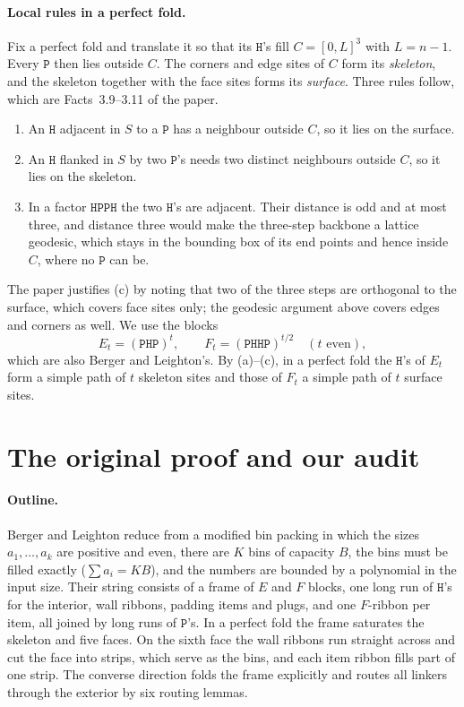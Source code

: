 \documentclass[11pt,letterpaper]{article}
\theoremstyle{definition}
\theoremstyle{remark}
\newcommand{\Hh}{\mathtt{H}}
\newcommand{\Pp}{\mathtt{P}}
\begin{document}
\paragraph{Local rules in a perfect fold.}
Fix a perfect fold and translate it so that its $\Hh$'s fill $C=[0,L]^3$ with $L=n-1$. Every $\Pp$
then lies outside $C$. The corners and edge sites of $C$ form its \emph{skeleton}, and the
skeleton together with the face sites forms its \emph{surface}. Three rules follow, which are
Facts~3.9--3.11 of the paper.
\begin{enumerate}[label=(\alph*)]
  \item An $\Hh$ adjacent in $S$ to a $\Pp$ has a neighbour outside $C$, so it lies on the surface.
  \item An $\Hh$ flanked in $S$ by two $\Pp$'s needs two distinct neighbours outside $C$, so it lies
    on the skeleton.
  \item In a factor $\Hh\Pp\Pp\Hh$ the two $\Hh$'s are adjacent. Their distance is odd and at most
    three, and distance three would make the three-step backbone a lattice geodesic, which stays in
    the bounding box of its end points and hence inside $C$, where no $\Pp$ can be.
\end{enumerate}
The paper justifies (c) by noting that two of the three steps are orthogonal to the surface, which
covers face sites only; the geodesic argument above covers edges and corners as well. We use the
blocks
\[
E_t=(\Pp\Hh\Pp)^t,\qquad F_t=(\Pp\Hh\Hh\Pp)^{t/2}\quad(t\text{ even}),
\]
which are also Berger and Leighton's. By (a)--(c), in a perfect fold the $\Hh$'s of $E_t$ form a
simple path of $t$ skeleton sites and those of $F_t$ a simple path of $t$ surface sites.

\section{The original proof and our audit}\label{sec:audit}

\paragraph{Outline.}
Berger and Leighton reduce from a modified bin packing in which the sizes $a_1,\dots,a_k$ are positive
and even, there are $K$ bins of capacity $B$, the bins must be filled exactly ($\sum a_i=KB$), and the
numbers are bounded by a polynomial in the input size. Their string consists of a frame of $E$ and
$F$ blocks, one long run of $\Hh$'s for the interior, wall ribbons, padding items and plugs, and one
$F$-ribbon per item, all joined by long runs of $\Pp$'s. In a perfect fold the frame saturates the
skeleton and five faces. On the sixth face the wall ribbons run straight across and cut the face
into strips, which serve as the bins, and each item ribbon fills part of one strip. The converse
direction folds the frame explicitly and routes all linkers through the exterior by six routing
lemmas.
\end{document}
